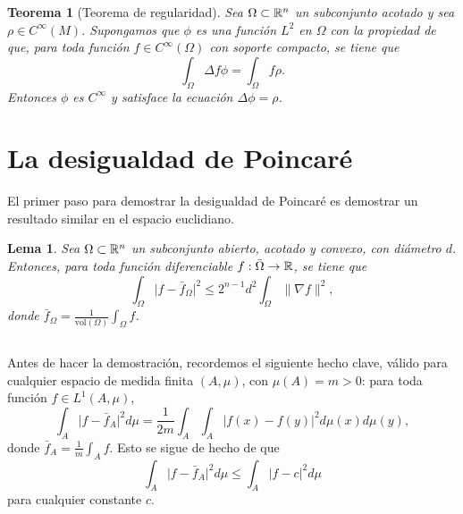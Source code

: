 \documentclass[11pt,a4paper]{amsbook}
\newtheorem{thm}[subsection]{Teorema}
\newtheorem{lemma}[subsection]{Lema}
\theoremstyle{remark} \newtheorem{rmk}[subsection]{Observación}
\theoremstyle{definition} \newtheorem{defn}[subsection]{Definición}
\theoremstyle{definition} \newtheorem{ex}[subsection]{Ejemplo}
\theoremstyle{definition} \newtheorem{ej}[subsection]{Ejercicio}
\begin{document}
\begin{thm}[Teorema de regularidad]
  Sea $\Omega\subset \mathbb R^n$ un subconjunto acotado y sea $\rho \in C^\infty(M)$. Supongamos que $\phi$ es una función $L^2$ en $\Omega$ con la propiedad de que, para toda función $f\in C^\infty(\Omega)$ con soporte compacto, se tiene que
  \begin{equation*}
\int_\Omega \Delta f \phi = \int_\Omega f \rho.
  \end{equation*}
  Entonces $\phi$ es $C^\infty$ y satisface la ecuación $\Delta \phi = \rho$.
\end{thm}

\section{La desigualdad de Poincaré}
El primer paso para demostrar la desigualdad de Poincaré es demostrar un resultado similar en el espacio euclidiano.

\begin{lemma} \label{lema:poincare-euclidiano}
Sea $\Omega \subset \mathbb R^n$ un subconjunto abierto, acotado y convexo, con diámetro $d$. Entonces, para toda función diferenciable $f: \bar{\Omega}\rightarrow \mathbb R$, se tiene que
\begin{equation*}
\int_{\Omega} \lvert f - \bar{f}_{\Omega} \rvert^2 \leq 2^{n-1} d^2 \int_\Omega \lVert \nabla f \rVert^2,
\end{equation*}
donde $\bar{f}_{\Omega} = \tfrac{1}{\mathrm{vol}(\Omega)} \int_{\Omega} f$.
\end{lemma}

\subsection{} Antes de hacer la demostración, recordemos el siguiente hecho clave, válido para cualquier espacio de medida finita $(A,\mu)$, con $\mu(A)=m>0$: para toda función $f\in L^1(A,\mu)$,
\begin{equation} \label{eq:promedios}
\int_A \lvert f - \bar{f}_{A} \rvert^2 d\mu = \frac{1}{2m} \int_A \int_A \lvert f(x)- f(y) \lvert^2 d\mu(x) d\mu(y),
\end{equation}
donde $\bar{f}_{A} = \frac{1}{m} \int_A f$. Esto se sigue de hecho de que
\begin{equation} \label{eq:promedios2}
\int_A \lvert f - \bar{f}_A \rvert^2 d\mu \leq \int_A \lvert f - c \vert^2 d\mu
\end{equation}
para cualquier constante $c$.
\end{document}
